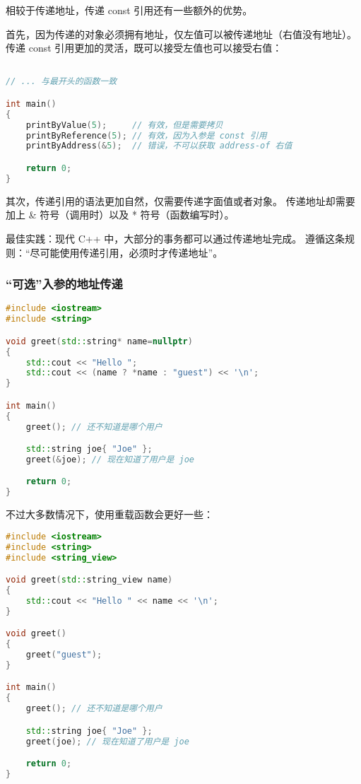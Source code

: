 \documentclass[../../LearnCpp.tex]{subfiles}
\begin{document}
相较于传递地址，传递 const 引用还有一些额外的优势。

首先，因为传递的对象必须拥有地址，仅左值可以被传递地址（右值没有地址）。
传递 const 引用更加的灵活，既可以接受左值也可以接受右值：

\begin{lstlisting}[language=C++]

// ... 与最开头的函数一致

int main()
{
    printByValue(5);     // 有效，但是需要拷贝
    printByReference(5); // 有效，因为入参是 const 引用
    printByAddress(&5);  // 错误，不可以获取 address-of 右值

    return 0;
}
\end{lstlisting}

其次，传递引用的语法更加自然，仅需要传递字面值或者对象。
传递地址却需要加上 \& 符号（调用时）以及 * 符号（函数编写时）。

最佳实践：现代 C++ 中，大部分的事务都可以通过传递地址完成。
遵循这条规则：“尽可能使用传递引用，必须时才传递地址”。

\subsubsection*{“可选”入参的地址传递}

\begin{lstlisting}[language=C++]
#include <iostream>
#include <string>

void greet(std::string* name=nullptr)
{
    std::cout << "Hello ";
    std::cout << (name ? *name : "guest") << '\n';
}

int main()
{
    greet(); // 还不知道是哪个用户

    std::string joe{ "Joe" };
    greet(&joe); // 现在知道了用户是 joe

    return 0;
}
\end{lstlisting}

不过大多数情况下，使用重载函数会更好一些：

\begin{lstlisting}[language=C++]
#include <iostream>
#include <string>
#include <string_view>

void greet(std::string_view name)
{
    std::cout << "Hello " << name << '\n';
}

void greet()
{
    greet("guest");
}

int main()
{
    greet(); // 还不知道是哪个用户

    std::string joe{ "Joe" };
    greet(joe); // 现在知道了用户是 joe

    return 0;
}
\end{lstlisting}
\end{document}

